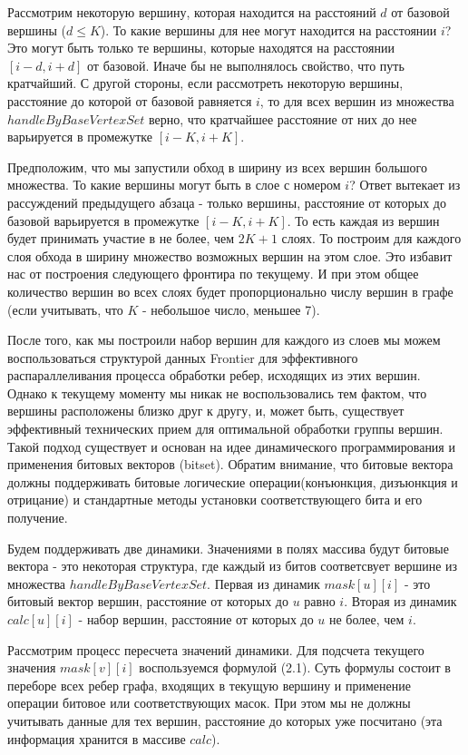 Рассмотрим некоторую вершину, которая находится на расстояний $d$ от базовой вершины ($d \leq K$). То какие вершины для нее могут находится на расстоянии $i$? Это могут быть только те вершины, которые находятся на расстоянии $[i-d, i+d]$ от базовой. Иначе бы не выполнялось свойство, что путь кратчайший. С другой стороны, если рассмотреть некоторую вершины, расстояние до которой от базовой равняется $i$, то для всех вершин из множества $handleByBaseVertexSet$ верно, что кратчайшее расстояние от них до нее варьируется в промежутке $[i-K, i+K]$. 

 Предположим, что мы запустили обход в ширину из всех вершин большого множества. То какие вершины могут быть в слое с номером $i$? Ответ вытекает из рассуждений предыдущего абзаца - только вершины, расстояние от которых до базовой варьируется в промежутке $[i-K, i+K]$. То есть каждая из вершин будет принимать участие в не более, чем $2K+1$ слоях. То построим для каждого слоя обхода в ширину множество возможных вершин на этом слое. Это избавит нас от построения следующего фронтира по текущему. И при этом общее количество вершин во всех слоях будет пропорционально числу вершин в графе (если учитывать, что $K$ - небольшое число, меньшее 7). 
 
 После того, как мы построили набор вершин для каждого из слоев мы можем воспользоваться структурой данных Frontier для эффективного распараллеливания процесса обработки ребер, исходящих из этих вершин. Однако к текущему моменту мы никак не воспользовались тем фактом, что вершины расположены близко друг к другу, и, может быть, существует эффективный технических прием для оптимальной обработки группы вершин. Такой подход существует и основан на идее динамического программирования и применения битовых векторов (bitset). Обратим внимание, что битовые вектора должны поддерживать битовые логические операции(конъюнкция, дизъюнкция и отрицание) и стандартные методы установки соответствующего бита и его получение.
 
 Будем поддерживать две динамики. Значениями в полях массива будут битовые вектора - это некоторая структура, где каждый из битов соответсвует вершине из множества $handleByBaseVertexSet$. Первая из динамик $mask[u][i]$ - это битовый вектор вершин, расстояние от которых до $u$ равно $i$. Вторая из динамик $calc[u][i]$ - набор вершин, расстояние от которых до $u$ не более, чем $i$. 
 
 Рассмотрим процесс пересчета значений динамики. Для подсчета текущего значения $mask[v][i]$ воспользуемся формулой (2.1). Суть формулы состоит в переборе всех ребер графа, входящих в текущую вершину и применение операции битовое или соответствующих масок. При этом мы не должны учитывать данные для тех вершин, расстояние до которых уже посчитано (эта информация хранится в массиве $calc$).  
  
